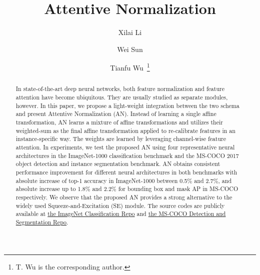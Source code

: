 \documentclass[runningheads]{llncs}
\begin{document}
\pagestyle{headings}
\mainmatter
\def\ECCVSubNumber{2668}  

\title{Attentive Normalization} 

\begin{comment}
\titlerunning{ECCV-20 submission ID \ECCVSubNumber} 
\authorrunning{ECCV-20 submission ID \ECCVSubNumber} 
\author{Anonymous ECCV submission}
\institute{Paper ID \ECCVSubNumber}
\end{comment}


\author{Xilai Li \and
Wei Sun \and
Tianfu Wu~\thanks{T. Wu is the corresponding author.}}
\maketitle

\begin{abstract}
In state-of-the-art deep neural networks, both feature normalization  and feature attention  have become ubiquitous. They are usually studied as separate modules, however. In this paper, we propose a light-weight integration between the two schema and present Attentive Normalization (AN). Instead of learning a single affine transformation, AN learns a mixture of affine transformations and utilizes their weighted-sum as the final affine transformation applied to re-calibrate features in an instance-specific way. The weights are learned by leveraging channel-wise feature attention. In experiments, we test the proposed AN using four representative neural architectures in the ImageNet-1000 classification benchmark and the MS-COCO 2017 object detection and instance segmentation benchmark. AN obtains consistent performance improvement for different neural architectures in both benchmarks with absolute increase of top-1 accuracy in ImageNet-1000 between 0.5\% and 2.7\%, and absolute increase up to 1.8\% and 2.2\% for  bounding box and mask AP  in MS-COCO respectively. We observe that the proposed AN provides a strong alternative to the widely used Squeeze-and-Excitation (SE) module. The source codes are publicly available at \href{https://github.com/iVMCL/AOGNet-v2}{the ImageNet Classification Repo} and \href{https://github.com/iVMCL/AttentiveNorm\_Detection}{the MS-COCO Detection and Segmentation Repo}.
\end{abstract}
\end{document}
